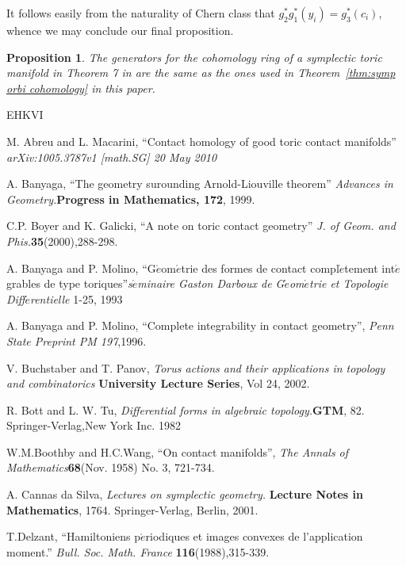 \documentclass[12pt]{amsart}
\newtheorem{proposition}[theorem]{Proposition}
\theoremstyle{definition}
\numberwithin{equation}{section}
\begin{document}
It follows easily from the naturality of Chern class that
$g_{2}^{*}g_{1}^{*}(y_{i})=g_{3}^{*}(c_{i})$, whence we may conclude
our final proposition.

\begin{proposition}
The generators for the cohomology ring of a symplectic toric
manifold in Theorem 7 in \cite{TW:quotients} are the same as the
ones used in Theorem~\ref{thm:symp orbi cohomology} in this paper.
\end{proposition}


\begin{thebibliography}{EHKVI}

M. Abreu and L. Macarini, ``Contact homology of good toric contact
manifolds'' {\em arXiv:1005.3787v1 [math.SG] 20 May 2010}

A. Banyaga, ``The geometry surounding Arnold-Liouville theorem''{\em
Advances in Geometry.}{\bf Progress in Mathematics, 172}, 1999.

C.P. Boyer and K. Galicki, ``A note on toric contact geometry''{\em
J. of Geom. and Phis.}{\bf 35}(2000),288-298.

A. Banyaga and P. Molino, ``G$\acute{e}$om$\acute{e}$trie des formes
de contact compl$\grave{e}$tement int$\acute{e}$grables de type
toriques''{\em s$\acute{e}$minaire Gaston Darboux de
G$\acute{e}$om$\acute{e}$trie et Topologie Diff$\acute{e}$rentielle}
1-25, 1993

A. Banyaga and P. Molino, ``Complete integrability in contact
geometry'', {\em Penn State Preprint PM 197},1996.

V. Buchstaber and T. Panov, {\em Torus actions and their
applications in topology and combinatorics} {\bf University Lecture
Series}, Vol 24, 2002.

 R. Bott and L. W. Tu, {\em Differential forms
in algebraic topology.}{\bf GTM}, 82. Springer-Verlag,New York Inc.
1982

W.M.Boothby and H.C.Wang, ``On contact manifolds'', {\em The Annals
of Mathematics}{\bf 68}(Nov. 1958) No. 3, 721-734.



 A. Cannas da Silva, {\em Lectures on symplectic
geometry.} {\bf Lecture Notes in Mathematics}, 1764.
Springer-Verlag, Berlin, 2001.

 T.Delzant, ``Hamiltoniens p$\acute{e}$riodiques et images convexes de l'application
moment.'' {\em Bull. Soc. Math. France} {\bf 116}(1988),315-339.


\end{thebibliography}
\end{document}
